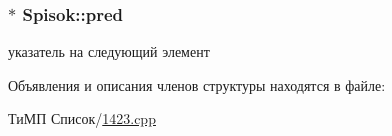 \hypertarget{struct_spisok_a58eec80fc33412d5c29174a83b69e59c}{}
\subsubsection[{pred}]{$\ast$ Spisok\+::pred}\label{struct_spisok_a58eec80fc33412d5c29174a83b69e59c}


указатель на следующий элемент 



Объявления и описания членов структуры находятся в файле\+:\begin{DoxyCompactItemize}
\item 
ТиМП Список/\hyperlink{1423_8cpp}{1423.\+cpp}\end{DoxyCompactItemize}
